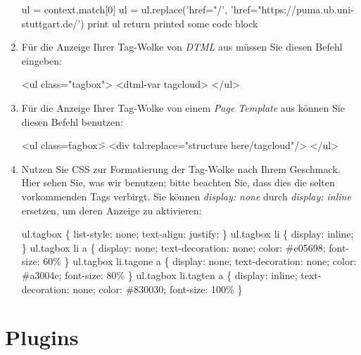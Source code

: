 \begin{enumerate}
    ul = context.match[0]\newline
    ul = ul.replace('href="/', 'href="https://puma.ub.uni-stuttgart.de/')\newline
    print ul\newline
    return printed\newline
    some code block

    \item Für die Anzeige Ihrer Tag-Wolke von \textit{DTML} aus müssen Sie diesen Befehl eingeben: 

    <ul class="tagbox">\newline
        <dtml-var tagcloud>\newline
    </ul> \newline

    \item Für die Anzeige Ihrer Tag-Wolke von einem \textit{Page Template} aus können Sie diesen Befehl benutzen: 

    <ul class=\"tagbox\">\newline
        <div tal:replace="structure here/tagcloud"/>\newline
    </ul>\newline

    \item Nutzen Sie CSS zur Formatierung der Tag-Wolke nach Ihrem Geschmack. Hier sehen Sie, was wir benutzen; bitte beachten Sie, dass dies die selten vorkommenden Tags verbirgt. Sie können \textit{display: none} durch \textit{display: inline} ersetzen, um deren Anzeige zu aktivieren: 

    ul.tagbox \{ list-style: none; text-align: justify; \}\newline
    ul.tagbox li \{ display: inline; \}\newline
    ul.tagbox li a \{ display: none; text-decoration: none; color: \#e05698; font-size: 60\% \} \newline
    ul.tagbox li.tagone a \{  display: none; text-decoration: none; color: \#a3004e; font-size: 80\% \} \newline
    ul.tagbox li.tagten a \{  display: inline; text-decoration: none; color: \#830030; font-size: 100\% \} \newline
\end{enumerate}

\section{Plugins} 
\label{sec:plugins}
